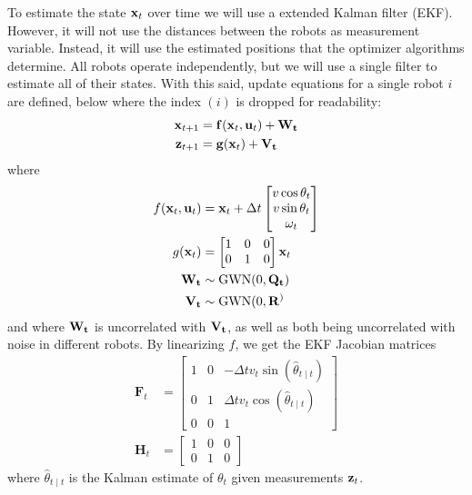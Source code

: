 To estimate the state $\totstate$ over time we will use a extended Kalman filter (EKF). However, it will not use the distances between the robots as measurement variable. Instead, it will use the estimated positions that the optimizer algorithms determine. All robots operate independently, but we will use a single filter to estimate all of their states. With this said, update equations for a single robot $i$ are defined, below where the index $(i)$ is dropped for readability:
\begin{align}
    \totstate[t+1] &= \f(\totstate, \totu) + \W \\
    \totmeas[t+1] &= \g(\totstate) + \V
\end{align}
where
\begin{align}
    f(\totstate, \totu) &= \totstate +\Delta t
    \begin{bmatrix} 
        v \cos \theta_t \\ v \sin \theta_t \\ \omega_t
    \end{bmatrix}\\
    g(\totstate) &= \begin{bmatrix}
        1 & 0 & 0 \\
        0 & 1 & 0
    \end{bmatrix} \totstate \\
    \W &\sim \text{GWN} (0, \Q) \\
    \V &\sim \text{GWN} (0, \R) 
\end{align}
and where $\W$ is uncorrelated with $\V$, as well as both being uncorrelated with noise in different robots. By linearizing $f$, we get the EKF Jacobian matrices
\begin{align}
    \mathbf{F}_t &=\begin{bmatrix}
        1 & 0 & -\Delta t v_{t} \sin(\hat{\theta}_{t \mid t}) \\
        0 & 1 & \Delta t v_{t} \cos(\hat{\theta}_{t \mid t}) \\
        0 & 0 & 1
    \end{bmatrix} \\
    \mathbf{H}_t &= \begin{bmatrix}
        1 & 0 & 0 \\
        0 & 1 & 0
    \end{bmatrix}
\end{align}
where $\hat{\theta}_{t \mid t}$ is the Kalman estimate of $\theta_t$ given measurements $\totmeas$.


